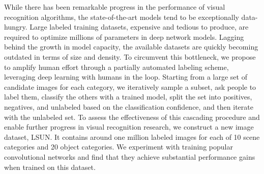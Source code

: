 While there has been remarkable progress in the performance of visual
recognition algorithms, the state-of-the-art models tend to be
exceptionally data-hungry. Large labeled training datasets, expensive
and tedious to produce, are required to optimize millions of
parameters in deep network models. Lagging behind the growth in model
capacity, the available datasets are quickly becoming outdated in
terms of size and density.  To circumvent this bottleneck, we propose
to amplify human effort through a partially automated labeling scheme,
leveraging deep learning with humans in the loop.  Starting from a
large set of candidate images for each category, we iteratively sample
a subset, ask people to label them, classify the others with a trained
model, split the set into positives, negatives, and unlabeled based on
the classification confidence, and then iterate with the unlabeled
set.  To assess the effectiveness of this cascading procedure
and enable further progress in visual recognition research, we
construct a new image dataset, LSUN.  It contains around one million
labeled images for each of 10 scene categories and 20 object categories.  We
experiment with training popular convolutional networks and find that
they achieve substantial performance gains when trained on this dataset.
